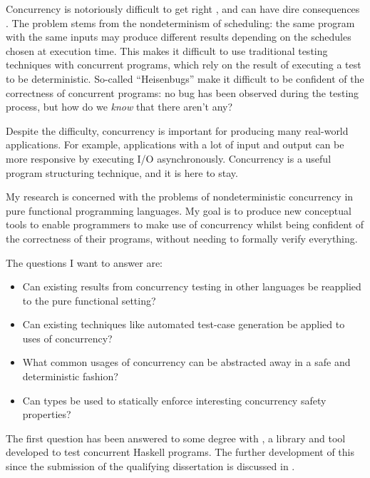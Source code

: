 Concurrency is notoriously difficult to get right \citep{overrated},
and can have dire consequences \citep{therac25}. The problem stems
from the nondeterminism of scheduling: the same program with the same
inputs may produce different results depending on the schedules chosen
at execution time. This makes it difficult to use traditional testing
techniques with concurrent programs, which rely on the result of
executing a test to be deterministic. So-called ``Heisenbugs'' make it
difficult to be confident of the correctness of concurrent programs:
no bug has been observed during the testing process, but how do we
\emph{know} that there aren't any?

Despite the difficulty, concurrency is important for producing many
real-world applications. For example, applications with a lot of input
and output can be more responsive by executing I/O asynchronously.
Concurrency is a useful program structuring technique, and it is here
to stay.

My research is concerned with the problems of nondeterministic
concurrency in pure functional programming languages. My goal is to
produce new conceptual tools to enable programmers to make use of
concurrency whilst being confident of the correctness of their
programs, without needing to formally verify everything.

The questions I want to answer are:

\begin{itemize}
\item Can existing results from concurrency testing in other languages
  be reapplied to the pure functional setting?

\item Can existing techniques like automated test-case generation be
  applied to uses of concurrency?

\item What common usages of concurrency can be abstracted away in a
  safe and deterministic fashion?

\item Can types be used to statically enforce interesting concurrency
  safety properties?
\end{itemize}

The first question has been answered to some degree with \dejafu{}
\citep{dejafu}, a library and tool developed to test concurrent
Haskell programs. The further development of this since the submission
of the qualifying dissertation is discussed in .
